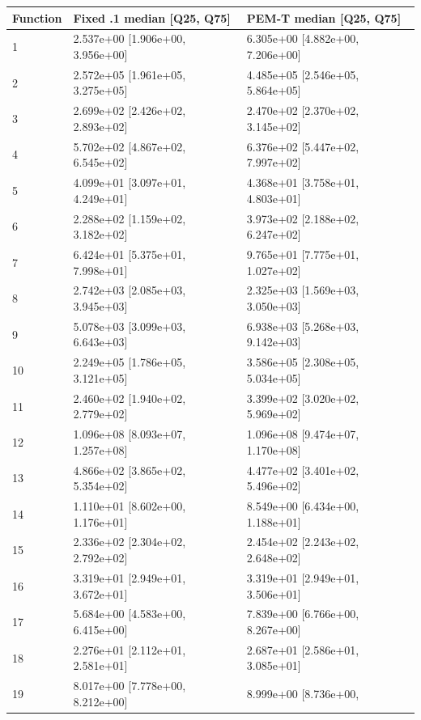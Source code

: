 \documentclass[11pt,a4paper]{article}
\begin{document}
\par\noindent\begin{minipage}{\linewidth}

\begin{longtable}[]{@{}lll@{}}
\toprule
Function & Fixed .1 median {[}Q25, Q75{]} & PEM-T median {[}Q25,
Q75{]} \\
\midrule
\endhead
1 & 2.537e+00 {[}1.906e+00, 3.956e+00{]} & 6.305e+00 {[}4.882e+00,
7.206e+00{]} \\
2 & 2.572e+05 {[}1.961e+05, 3.275e+05{]} & 4.485e+05 {[}2.546e+05,
5.864e+05{]} \\
3 & 2.699e+02 {[}2.426e+02, 2.893e+02{]} & 2.470e+02 {[}2.370e+02,
3.145e+02{]} \\
4 & 5.702e+02 {[}4.867e+02, 6.545e+02{]} & 6.376e+02 {[}5.447e+02,
7.997e+02{]} \\
5 & 4.099e+01 {[}3.097e+01, 4.249e+01{]} & 4.368e+01 {[}3.758e+01,
4.803e+01{]} \\
6 & 2.288e+02 {[}1.159e+02, 3.182e+02{]} & 3.973e+02 {[}2.188e+02,
6.247e+02{]} \\
7 & 6.424e+01 {[}5.375e+01, 7.998e+01{]} & 9.765e+01 {[}7.775e+01,
1.027e+02{]} \\
8 & 2.742e+03 {[}2.085e+03, 3.945e+03{]} & 2.325e+03 {[}1.569e+03,
3.050e+03{]} \\
9 & 5.078e+03 {[}3.099e+03, 6.643e+03{]} & 6.938e+03 {[}5.268e+03,
9.142e+03{]} \\
10 & 2.249e+05 {[}1.786e+05, 3.121e+05{]} & 3.586e+05 {[}2.308e+05,
5.034e+05{]} \\
11 & 2.460e+02 {[}1.940e+02, 2.779e+02{]} & 3.399e+02 {[}3.020e+02,
5.969e+02{]} \\
12 & 1.096e+08 {[}8.093e+07, 1.257e+08{]} & 1.096e+08 {[}9.474e+07,
1.170e+08{]} \\
13 & 4.866e+02 {[}3.865e+02, 5.354e+02{]} & 4.477e+02 {[}3.401e+02,
5.496e+02{]} \\
14 & 1.110e+01 {[}8.602e+00, 1.176e+01{]} & 8.549e+00 {[}6.434e+00,
1.188e+01{]} \\
15 & 2.336e+02 {[}2.304e+02, 2.792e+02{]} & 2.454e+02 {[}2.243e+02,
2.648e+02{]} \\
16 & 3.319e+01 {[}2.949e+01, 3.672e+01{]} & 3.319e+01 {[}2.949e+01,
3.506e+01{]} \\
17 & 5.684e+00 {[}4.583e+00, 6.415e+00{]} & 7.839e+00 {[}6.766e+00,
8.267e+00{]} \\
18 & 2.276e+01 {[}2.112e+01, 2.581e+01{]} & 2.687e+01 {[}2.586e+01,
3.085e+01{]} \\
19 & 8.017e+00 {[}7.778e+00, 8.212e+00{]} & 8.999e+00 {[}8.736e+00,

\end{longtable}
\end{minipage}
\end{document}

